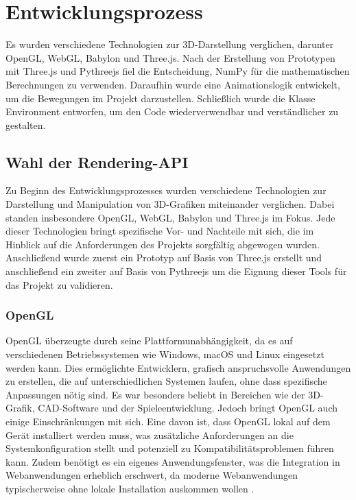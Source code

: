 \section{Entwicklungsprozess}
Es wurden verschiedene Technologien zur 3D-Darstellung verglichen, darunter OpenGL, WebGL, Babylon und Three.js.
Nach der Erstellung von Prototypen mit Three.js und Pythreejs fiel die Entscheidung, NumPy für die mathematischen Berechnungen zu verwenden.
Daraufhin wurde eine Animationslogik entwickelt, um die Bewegungen im Projekt darzustellen. Schließlich wurde die Klasse Environment entworfen,
um den Code wiederverwendbar und verständlicher zu gestalten.

\subsection{Wahl der Rendering-API}
Zu Beginn des Entwicklungsprozesses wurden verschiedene Technologien zur Darstellung und Manipulation von 3D-Grafiken miteinander verglichen.
Dabei standen insbesondere OpenGL, WebGL, Babylon und Three.js im Fokus.
Jede dieser Technologien bringt spezifische Vor- und Nachteile mit sich, die im Hinblick auf die Anforderungen des Projekts sorgfältig abgewogen wurden.
Anschließend wurde zuerst ein Prototyp auf Basis von Three.js erstellt und anschließend ein zweiter auf Basis von Pythreejs um die Eignung dieser Tools 
für das Projekt zu validieren. 


\subsubsection{OpenGL}
OpenGL überzeugte durch seine Plattformunabhängigkeit, da es auf verschiedenen Betriebssystemen wie Windows, macOS und Linux eingesetzt werden kann.
Dies ermöglichte Entwicklern, grafisch anspruchsvolle Anwendungen zu erstellen, die auf unterschiedlichen Systemen laufen, ohne dass spezifische Anpassungen nötig sind.
Es war besonders beliebt in Bereichen wie der 3D-Grafik, CAD-Software und der Spieleentwicklung.
Jedoch bringt OpenGL auch einige Einschränkungen mit sich.
Eine davon ist, dass OpenGL lokal auf dem Gerät installiert werden muss,
was zusätzliche Anforderungen an die Systemkonfiguration stellt und potenziell zu Kompatibilitätsproblemen führen kann.
Zudem benötigt es ein eigenes Anwendungsfenster, was die Integration in Webanwendungen erheblich erschwert,
da moderne Webanwendungen typischerweise ohne lokale Installation auskommen wollen .

